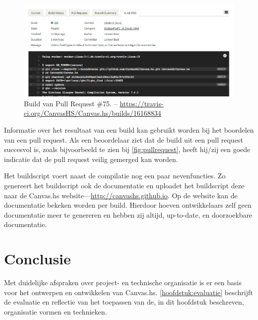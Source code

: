 \begin{figure}[H]
\begin{center}
\includegraphics[keepaspectratio,width=\textwidth]{./images/travis.png}
\caption{Build van Pull Request \#75. – \url{https://travis-ci.org/CanvasHS/Canvas.hs/builds/16168834}}
\label{fig:travis}
\end{center}
\end{figure}

Informatie over het resultaat van een build kan gebruikt worden bij het boordelen van een pull request. Als een beoordelaar ziet dat de build uit een pull request succesvol is, zoals bijvoorbeeld te zien bij \autoref{fig:pullrequest}, heeft hij/zij een goede indicatie dat de pull request veilig gemerged kan worden.

Het buildscript voert naast de compilatie nog een paar nevenfuncties. Zo genereert het buildscript ook de documentatie en uploadet het buildscript deze naar de Canvas.hs website—\url{http://canvashs.github.io}. Op de website kan de documentatie bekeken worden per build. Hierdoor hoeven ontwikkelaars zelf geen documentatie meer te genereren en hebben zij altijd, up-to-date, en doorzoekbare documentatie.

\section{Conclusie}
Met duidelijke afspraken over project- en technische organisatie is er een basis voor het ontwerpen en ontwikkelen van Canvas.hs. \autoref{hoofdstuk:evaluatie} beschrijft de evaluatie en reflectie van het toepassen van de, in dit hoofdstuk beschreven, organisatie vormen en technieken. 
